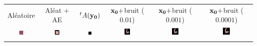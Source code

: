 \begin{tabular}{c c c c c c}
Aléatoire  &  Aléat + AE  &  $^tA(\bf{y_0})$  & $\bf{x_0}+$bruit ($0.01$)   & $\bf{x_0}+$bruit ($0.001$)   & $\bf{x_0}+$bruit ($0.0001$)

\\


%
\includegraphics[width=0.15\textwidth]{resultats (legacy)/PGD/comp-inits_1-init-pas=1e-20_filtre=s-None.png}
&
\includegraphics[width=0.15\textwidth]{resultats (legacy)/PGD/comp-inits_2-init-pas=1e-20_filtre=s-None.png}
&
\includegraphics[width=0.15\textwidth]{resultats (legacy)/PGD/comp-inits_3-init-pas=1e-20_filtre=s-None.png}
&
\includegraphics[width=0.15\textwidth]{resultats (legacy)/PGD/comp-inits_4-init-pas=1e-20_filtre=s-None.png}
&
\includegraphics[width=0.15\textwidth]{resultats (legacy)/PGD/comp-inits_5-init-pas=1e-20_filtre=s-None.png}
&
\includegraphics[width=0.15\textwidth]{resultats (legacy)/PGD/comp-inits_6-init-pas=1e-20_filtre=s-None.png}

\\ \\




\end{tabular}

